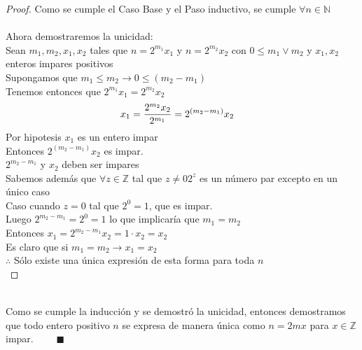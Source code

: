 \documentclass[14pt]{extarticle}
\begin{document}
\begin{proof}
            Como se cumple el Caso Base y el Paso inductivo, se cumple $\forall n \in \mathbb{N}$ \\ \\
            Ahora demostraremos la unicidad: \\
            Sean $m_1,m_2,x_1,x_2$ tales que $n = 2^{m_1}x_1$ y $n= 2^{m_2}x_2$ con $0 \leq m_1 \vee m_2$ y $x_1,x_2$ enteros impares positivos \\
            Supongamos que $m_1 \leq m_2 \rightarrow 0 \leq (m_2-m_1)$ \\
            Tenemos entonces que $2^{m_1}x_1 = 2^{m_2}x_2$ 
            \begin{align}
                \notag x_1 &= \frac{2^{m_2}x_2}{2^{m_1}} = 2^{(m_2-m_1)}x_2
            \end{align}
            Por hipotesis $x_1$ es un entero impar \\
            Entonces $ 2^{(m_2-m_1)}x_2$ es impar. \\
            \therefore $2^{m_2-m_1}$ y $x_2$ deben ser impares \\
            Sabemos además que $\forall z \in \mathbb{Z} $ tal que $z \neq 0 2^z$ es un número par excepto en un único caso\\
            Caso cuando $z=0$ tal que $2^0 = 1$, que es impar.\\
            Luego $2^{m_2-m_1} = 2^0 = 1$ lo que implicaría que $m_1=m_2$ \\
            Entonces $x_1 = 2^{m_2-m_1}x_2 = 1\cdot x_2 = x_2$ \\
            Es claro que si $m_1=m_2 \rightarrow x_1=x_2$ \\
            $\therefore$ Sólo existe una única expresión de esta forma para toda $n$ \\
        \end{proof}
        \\ Como se cumple la inducción y se demostró la unicidad, entonces demostramos que todo entero positivo $n$ se expresa de manera única como $n = 2mx$ para $x \in \mathbb{Z}$ impar. $\qquad \blacksquare$
\end{document}

